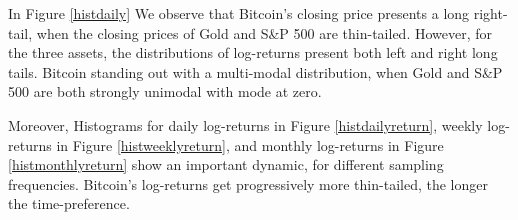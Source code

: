 \documentclass[12pt]{article}
\begin{document}
\begin{table}[!htbp]
\begin{center}
\caption{\label{allreturn}Descriptive statistics for log-returns }

\end{center}
\end{table}




In Figure \ref{histdaily} We observe that Bitcoin's closing price presents a long right-tail, when the closing prices of Gold and S\&P 500 are thin-tailed. However, for the three assets, the distributions of log-returns present both left and right long tails. Bitcoin standing out with a multi-modal distribution, when Gold and S\&P 500 are both strongly unimodal with mode at zero.  

Moreover, Histograms for daily log-returns in Figure \ref{histdailyreturn}, weekly log-returns in Figure \ref{histweeklyreturn}, and monthly log-returns in Figure \ref{histmonthlyreturn} show an important dynamic, for different sampling frequencies. Bitcoin's log-returns get progressively more thin-tailed, the longer the time-preference.
\end{document}
